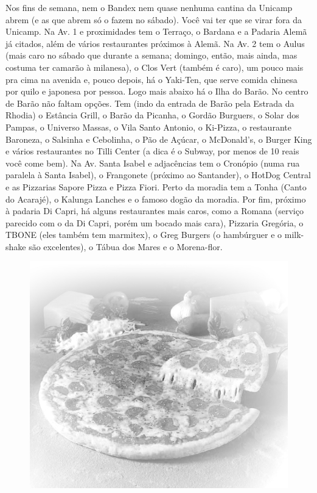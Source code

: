 Nos fins de semana, nem o Bandex nem quase nenhuma cantina da Unicamp abrem (e
as que abrem só o fazem no sábado). Você vai ter que se virar fora da Unicamp.
Na Av. 1 e proximidades tem o Terraço, o Bardana e a Padaria Alemã já citados, além de
vários restaurantes próximos à Alemã. Na Av. 2 tem o Aulus (mais caro no sábado
que durante a semana; domingo, então, mais ainda, mas costuma ter camarão
à milanesa), o Clos Vert (também é caro), um pouco mais pra cima na avenida e,
pouco depois, há o Yaki-Ten, que serve comida chinesa por quilo e japonesa por
pessoa. Logo mais abaixo há o Ilha do Barão. No centro de Barão não faltam
opções. Tem (indo da entrada de Barão pela Estrada da Rhodia) o Estância Grill,
o Barão da Picanha, o Gordão Burguers, o Solar dos Pampas, o Universo Massas,
o Vila Santo Antonio, o Ki-Pizza, o restaurante Baroneza, o Salsinha
e Cebolinha, o Pão de Açúcar, o McDonald's, o Burger King e vários restaurantes no Tilli Center (a dica
é o Subway, por menos de 10 reais você come bem). Na Av. Santa Isabel
e adjacências tem o Cronópio (numa rua paralela à Santa Isabel), o Frangonete
(próximo ao Santander), o HotDog Central e as Pizzarias Sapore Pizza e Pizza
Fiori. Perto da moradia tem a Tonha (Canto do Acarajé), o Kalunga Lanches
e o famoso dogão da moradia. Por fim, próximo à padaria Di Capri, há alguns
restaurantes mais caros, como a Romana (serviço parecido com o da Di Capri,
porém um bocado mais cara), Pizzaria Gregória, o TBONE (eles também tem
marmitex), o Greg Burgers (o hambúrguer e o milk-shake são excelentes), o Tábua
dos Mares e o Morena-flor.
\begin{figure}[h!]
    \centering
    \includegraphics[scale=0.28,keepaspectratio=true]{img/imgs/6-comida/-045.jpg}
\end{figure}


